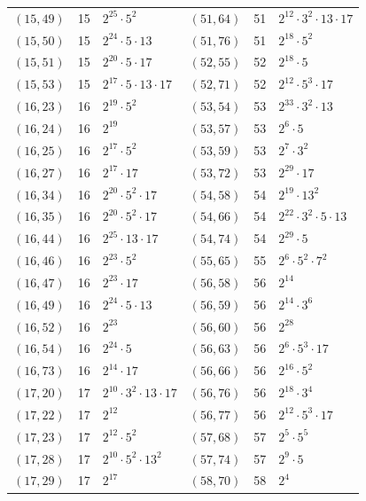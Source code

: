 \documentclass[11pt]{article}
\begin{document}
\begin{longtable}{@{}lrl@{\qquad}lrl@{}}
$(15,49)$ & 15 & $2^{25}\cdot 5^{2}$ & $(51,64)$ & 51 & $2^{12}\cdot 3^{2}\cdot 13\cdot 17$\\
$(15,50)$ & 15 & $2^{24}\cdot 5\cdot 13$ & $(51,76)$ & 51 & $2^{18}\cdot 5^{2}$\\
$(15,51)$ & 15 & $2^{20}\cdot 5\cdot 17$ & $(52,55)$ & 52 & $2^{18}\cdot 5$\\
$(15,53)$ & 15 & $2^{17}\cdot 5\cdot 13\cdot 17$ & $(52,71)$ & 52 & $2^{12}\cdot 5^{3}\cdot 17$\\
$(16,23)$ & 16 & $2^{19}\cdot 5^{2}$ & $(53,54)$ & 53 & $2^{33}\cdot 3^{2}\cdot 13$\\
$(16,24)$ & 16 & $2^{19}$ & $(53,57)$ & 53 & $2^{6}\cdot 5$\\
$(16,25)$ & 16 & $2^{17}\cdot 5^{2}$ & $(53,59)$ & 53 & $2^{7}\cdot 3^{2}$\\
$(16,27)$ & 16 & $2^{17}\cdot 17$ & $(53,72)$ & 53 & $2^{29}\cdot 17$\\
$(16,34)$ & 16 & $2^{20}\cdot 5^{2}\cdot 17$ & $(54,58)$ & 54 & $2^{19}\cdot 13^{2}$\\
$(16,35)$ & 16 & $2^{20}\cdot 5^{2}\cdot 17$ & $(54,66)$ & 54 & $2^{22}\cdot 3^{2}\cdot 5\cdot 13$\\
$(16,44)$ & 16 & $2^{25}\cdot 13\cdot 17$ & $(54,74)$ & 54 & $2^{29}\cdot 5$\\
$(16,46)$ & 16 & $2^{23}\cdot 5^{2}$ & $(55,65)$ & 55 & $2^{6}\cdot 5^{2}\cdot 7^{2}$\\
$(16,47)$ & 16 & $2^{23}\cdot 17$ & $(56,58)$ & 56 & $2^{14}$\\
$(16,49)$ & 16 & $2^{24}\cdot 5\cdot 13$ & $(56,59)$ & 56 & $2^{14}\cdot 3^{6}$\\
$(16,52)$ & 16 & $2^{23}$ & $(56,60)$ & 56 & $2^{28}$\\
$(16,54)$ & 16 & $2^{24}\cdot 5$ & $(56,63)$ & 56 & $2^{6}\cdot 5^{3}\cdot 17$\\
$(16,73)$ & 16 & $2^{14}\cdot 17$ & $(56,66)$ & 56 & $2^{16}\cdot 5^{2}$\\
$(17,20)$ & 17 & $2^{10}\cdot 3^{2}\cdot 13\cdot 17$ & $(56,76)$ & 56 & $2^{18}\cdot 3^{4}$\\
$(17,22)$ & 17 & $2^{12}$ & $(56,77)$ & 56 & $2^{12}\cdot 5^{3}\cdot 17$\\
$(17,23)$ & 17 & $2^{12}\cdot 5^{2}$ & $(57,68)$ & 57 & $2^{5}\cdot 5^{5}$\\
$(17,28)$ & 17 & $2^{10}\cdot 5^{2}\cdot 13^{2}$ & $(57,74)$ & 57 & $2^{9}\cdot 5$\\
$(17,29)$ & 17 & $2^{17}$ & $(58,70)$ & 58 & $2^{4}$\\

\end{longtable}
\end{document}
